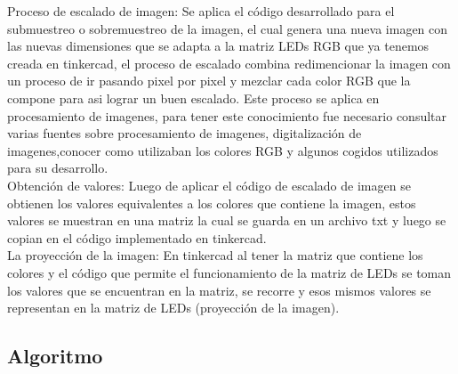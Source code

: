 \documentclass{article}
\begin{document}
Proceso de escalado de imagen: Se aplica el código desarrollado para el submuestreo o sobremuestreo de la imagen, el cual genera una nueva imagen con las nuevas dimensiones que se adapta a la matriz LEDs RGB que ya tenemos creada en tinkercad, el proceso de escalado combina redimencionar la imagen con un proceso de ir pasando pixel por pixel y mezclar cada color RGB que la compone para asi lograr un buen escalado. Este proceso se aplica en procesamiento de imagenes, para tener este conocimiento fue necesario consultar varias fuentes sobre procesamiento de imagenes, digitalización de imagenes,conocer como utilizaban los colores RGB y algunos cogidos utilizados para su desarrollo.\\

Obtención de valores: Luego de aplicar el código de escalado de imagen se obtienen los valores equivalentes a los colores que contiene la imagen, estos valores se muestran en una matriz la cual se guarda en un archivo txt y luego se copian en el código implementado en tinkercad.\\

La proyección de la imagen: En tinkercad al tener la matriz que contiene los colores y el código que permite el funcionamiento de la matriz de LEDs se toman los valores que se encuentran en la matriz, se recorre y esos mismos valores se representan en la matriz de LEDs (proyección de la imagen).

\subsection{Algoritmo}
\end{document}
